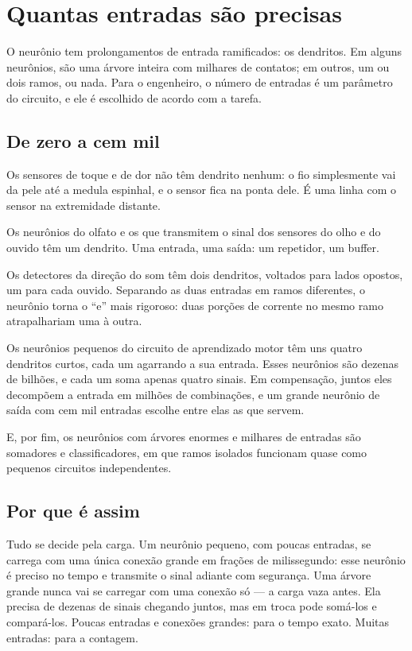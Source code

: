 \chapter{Quantas entradas são precisas}

O neurônio tem prolongamentos de entrada ramificados: os dendritos. Em alguns neurônios, são uma árvore inteira com milhares de contatos; em outros, um ou dois ramos, ou nada. Para o engenheiro, o número de entradas é um parâmetro do circuito, e ele é escolhido de acordo com a tarefa.

\section*{De zero a cem mil}

Os sensores de toque e de dor não têm dendrito nenhum: o fio simplesmente vai da pele até a medula espinhal, e o sensor fica na ponta dele. É uma linha com o sensor na extremidade distante.


Os neurônios do olfato e os que transmitem o sinal dos sensores do olho e do ouvido têm um dendrito. Uma entrada, uma saída: um repetidor, um buffer.

Os detectores da direção do som têm dois dendritos, voltados para lados opostos, um para cada ouvido. Separando as duas entradas em ramos diferentes, o neurônio torna o ``e'' mais rigoroso: duas porções de corrente no mesmo ramo atrapalhariam uma à outra.

Os neurônios pequenos do circuito de aprendizado motor têm uns quatro dendritos curtos, cada um agarrando a sua entrada. Esses neurônios são dezenas de bilhões, e cada um soma apenas quatro sinais. Em compensação, juntos eles decompõem a entrada em milhões de combinações, e um grande neurônio de saída com cem mil entradas escolhe entre elas as que servem.

E, por fim, os neurônios com árvores enormes e milhares de entradas são somadores e classificadores, em que ramos isolados funcionam quase como pequenos circuitos independentes.

\section*{Por que é assim}

Tudo se decide pela carga. Um neurônio pequeno, com poucas entradas, se carrega com uma única conexão grande em frações de milissegundo: esse neurônio é preciso no tempo e transmite o sinal adiante com segurança. Uma árvore grande nunca vai se carregar com uma conexão só --- a carga vaza antes. Ela precisa de dezenas de sinais chegando juntos, mas em troca pode somá-los e compará-los. Poucas entradas e conexões grandes: para o tempo exato. Muitas entradas: para a contagem.

